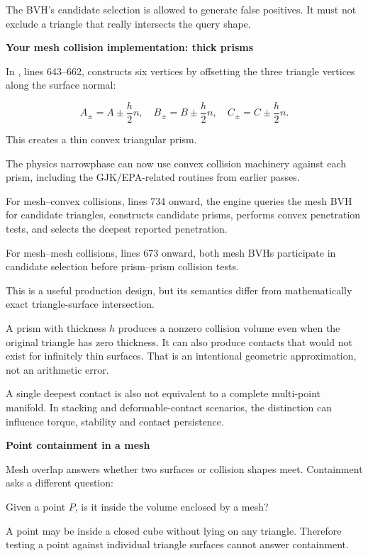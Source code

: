 The BVH's candidate selection is allowed to generate false positives. It must not exclude a triangle that really intersects the query shape.

\textbf{Your mesh collision implementation: thick prisms}

In , lines 643--662,  constructs six vertices by offsetting the three triangle vertices along the surface normal:

\[
A_\pm=A\pm\frac{h}{2}n,\quad B_\pm=B\pm\frac{h}{2}n,\quad C_\pm=C\pm\frac{h}{2}n.
\]

This creates a thin convex triangular prism.

The physics narrowphase can now use convex collision machinery against each prism, including the GJK/EPA-related routines from earlier passes.

For mesh--convex collisions, lines 734 onward, the engine queries the mesh BVH for candidate triangles, constructs candidate prisms, performs convex penetration tests, and selects the deepest reported penetration.

For mesh--mesh collisions, lines 673 onward, both mesh BVHs participate in candidate selection before prism--prism collision tests.

This is a useful production design, but its semantics differ from mathematically exact triangle-surface intersection.

A prism with thickness \(h\) produces a nonzero collision volume even when the original triangle has zero thickness. It can also produce contacts that would not exist for infinitely thin surfaces. That is an intentional geometric approximation, not an arithmetic error.

A single deepest contact is also not equivalent to a complete multi-point manifold. In stacking and deformable-contact scenarios, the distinction can influence torque, stability and contact persistence.

\textbf{Point containment in a mesh}

Mesh overlap answers whether two surfaces or collision shapes meet. Containment asks a different question:

Given a point \(P\), is it inside the volume enclosed by a mesh?

A point may be inside a closed cube without lying on any triangle. Therefore testing a point against individual triangle surfaces cannot answer containment.

